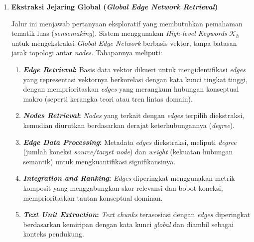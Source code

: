 \begin{enumerate}[label=\textbf{\arabic*.}, leftmargin=*, itemsep=10pt]
\begin{enumerate}[label=\textbf{\alph*.}, leftmargin=*, itemsep=5pt]
                    \noindent
                    di mana $\mathcal{L}_{\text{local}}$ merupakan fungsi dari kata kunci spesifik dan struktur graf, yang direduksi menjadi subset informasi paling signifikan untuk menjawab kueri.


              \item \textbf{Ekstraksi Jejaring Global (\textit{Global Edge Network Retrieval})}

                    \hspace*{0.75cm}Jalur ini menjawab pertanyaan eksploratif yang membutuhkan pemahaman tematik luas (\textit{sensemaking}). Sistem menggunakan \textit{High-level Keywords} $\mathcal{K}_h$ untuk mengekstraksi \textit{Global Edge Network} berbasis vektor, tanpa batasan jarak topologi antar \textit{nodes}. Tahapannya meliputi:

                    \begin{enumerate}[label=\textbf{\arabic*.}, leftmargin=*, itemsep=6pt]

                        \item \textbf{\textit{Edge Retrieval}:} Basis data vektor dikueri untuk mengidentifikasi \textit{edges} yang representasi vektornya berkorelasi dengan kata kunci tingkat tinggi, dengan memprioritaskan \textit{edges} yang merangkum hubungan konseptual makro (seperti kerangka teori atau tren lintas domain).

                        \item \textbf{\textit{Nodes Retrieval}:} \textit{Nodes} yang terkait dengan \textit{edges} terpilih diekstraksi, kemudian diurutkan berdasarkan derajat keterhubungannya (\textit{degree}).

                        \item \textbf{\textit{Edge Data Processing}:} Metadata \textit{edges} diekstraksi, meliputi \textit{degree} (jumlah koneksi \textit{source/target node}) dan \textit{weight} (kekuatan hubungan semantik) untuk mengkuantifikasi signifikansinya.

                        \item \textbf{\textit{Integration and Ranking}:} \textit{Edges} diperingkat menggunakan metrik komposit yang menggabungkan skor relevansi dan bobot koneksi, memprioritaskan tautan konseptual dominan.

                        \item \textbf{\textit{Text Unit Extraction}:} \textit{Text chunks} terasosiasi dengan \textit{edges} diperingkat berdasarkan kemiripan dengan kata kunci \textit{global} dan diambil sebagai konteks pendukung.


\end{enumerate}
\end{enumerate}
\end{enumerate}
